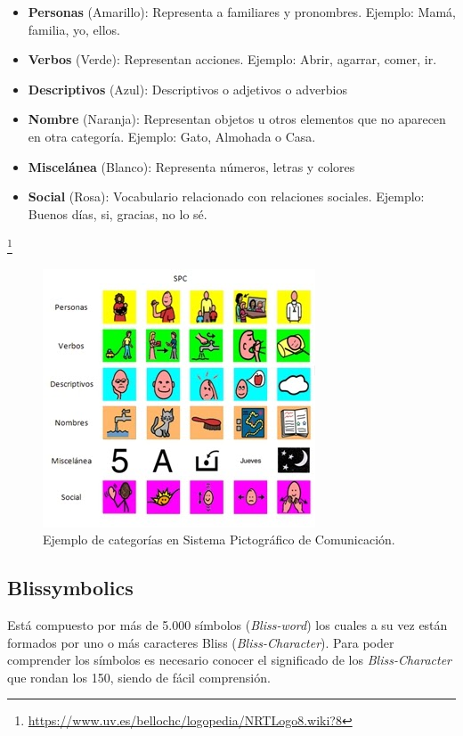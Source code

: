 \begin{itemize}
	\item \textbf{Personas} (Amarillo): Representa a familiares y pronombres. Ejemplo: Mamá, familia,  yo, ellos.
	\item \textbf{Verbos} (Verde): Representan acciones. Ejemplo: Abrir, agarrar, comer, ir.
	\item \textbf{Descriptivos} (Azul): Descriptivos o adjetivos o adverbios
	\item \textbf{Nombre} (Naranja): Representan objetos u otros elementos que no aparecen en otra categoría. Ejemplo: Gato, Almohada o Casa.
	\item \textbf{Miscelánea} (Blanco): Representa números, letras y colores
	\item \textbf{Social} (Rosa): Vocabulario relacionado con relaciones sociales. Ejemplo: Buenos días, si, gracias, no lo sé.
	
\end{itemize}

\footnote{\url{https://www.uv.es/bellochc/logopedia/NRTLogo8.wiki?8}}

\begin{figure}[h!]
	\centering
	\includegraphics[width=0.7\linewidth]{Imagenes/Bitmap/SPCcolores}
	\caption{Ejemplo de categorías en Sistema Pictográfico de Comunicación.}
	\label{fig:spccolores}
\end{figure}

\subsection{Blissymbolics}
Está compuesto por más de 5.000 símbolos (\textit{Bliss-word}) los cuales a su vez están formados por uno o más caracteres Bliss (\textit{Bliss-Character}). Para poder comprender los símbolos es necesario conocer el significado de los \textit{Bliss-Character} que rondan los 150, siendo de fácil comprensión.

